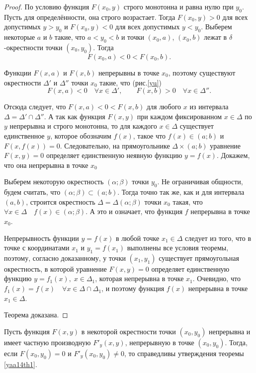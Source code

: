 \begin{proof}

По условию функция $F(x_0,y)$ строго монотонна и равна нулю при  $y_0$.  Пусть для определённости, она строго возрастает. Тогда $F(x_0,y)>0$ для всех допустимых $y>y_0$ и $F(x_0,y)<0$ для всех допустимых $y<y_0$.
Выберем некоторые $a$ и $b$ такие, что $a<y_0<b$ и точки $(x_0,a)$, $(x_0,b)$ лежат в $\delta$-окрестности точки $(x_0,y_0)$. Тогда
$$
F(x_0,a)<0<F(x_0,b).
$$

Функции $F(x,a)$ и $F(x,b)$ непрерывны в точке $x_0$, поэтому существуют окрестности $\Delta'$ и $\Delta''$ точки $x_0$ такие, что (рис.\ref{yu})
$$
F(x,a)<0 \quad \forall x\in \Delta', \qquad F(x,b)>0\quad \forall x\in \Delta''.
$$

Отсюда следует, что $F(x,a)<0<F(x,b)$ для любого $x$ из интервала $\Delta = \Delta'\cap\Delta''$. А так как функция $F(x,y)$ при каждом фиксированном $x\in\Delta$ по $y$ непрерывна и строго монотонна, то для каждого $x\in \Delta$ существует единственное $y$, которое обозначим $f(x)$, такое что $f(x)\in(a;b)$ и $F(x,f(x))=0$. Следовательно, на прямоугольнике $\Delta\times(a;b)$ уравнение $F(x,y)=0$ определяет единственную неявную функцию $y=f(x)$. Докажем, что она непрерывна в точке $x_0$

\label{yu}
Выберем некоторую окрестность $(\alpha;\beta)$ точки $y_0$. Не ограничивая общности, будем считать, что $(\alpha;\beta)\subset (a;b)$. Тогда точно так же, как и для интервала $(a,b)$, строится окрестность $\Delta=\Delta(\alpha;\beta)$ точки $x_0$ такая, что $\forall x\in\Delta \quad f(x)\in(\alpha;\beta)$. А это и означает, что функция $f$ непрерывна в точке $x_0$.

Непрерывность функции $y=f(x)$ в любой точке $x_1\in\Delta$ следует из того, что в точке с координатами $x_1$ и $y_1=f(x_1)$ выполнены все условия теоремы, поэтому, согласно доказанному, у точки $(x_1,y_1)$ существует прямоугольная окрестность, в которой уравнение $F(x,y)=0$ определяет единственную функцию $y=f_1(x),\;x\in\Delta_1$, которая непрерывна в точке $x_1$. Очевидно, что $f_1(x)=f(x)\quad \forall x\in\Delta\cap\Delta_1$, и поэтому функция $f(x)$ непрерывна в точке $x_1\in\Delta$.

Теорема доказана.
\end{proof}
\begin{cons}
Пусть функция $F(x,y)$ в некоторой окрестности точки $(x_0,y_0)$ непрерывна и имеет частную производную $F'_y(x,y)$, непрерывную в точке $(x_0,y_0)$. Тогда, если $F(x_0,y_0)=0$ и $F'_y(x_0,y_0)\ne 0 $, то справедливы утверждения теоремы \ref{yaa14th1}.
\end{cons}

